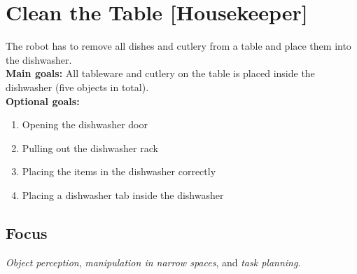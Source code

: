 \section{Clean the Table [Housekeeper]}
\label{test:clean-the-table}
The robot has to remove all dishes and cutlery from a table and place them into the dishwasher.\\

\noindent \textbf{Main goals:} All tableware and cutlery on the table is placed inside the dishwasher (five objects in total).\\

\noindent \textbf{Optional goals:}
\begin{enumerate}[nosep]
	\item Opening the dishwasher door
	\item Pulling out the dishwasher rack
	\item Placing the items in the dishwasher correctly
	\item Placing a dishwasher tab inside the dishwasher
\end{enumerate}

\subsection*{Focus}
\emph{Object perception}, \emph{manipulation in narrow spaces}, and \emph{task planning}.

